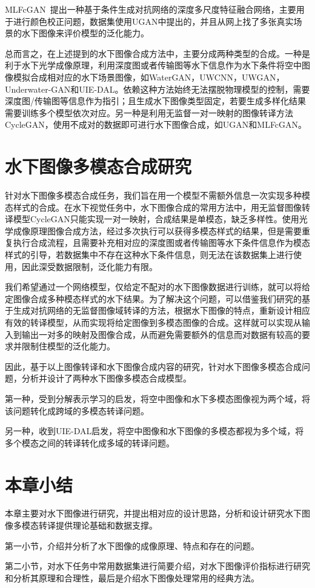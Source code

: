 MLFcGAN~\cite{liu2019mlfcgan}提出一种基于条件生成对抗网络的深度多尺度特征融合网络，主要用于进行颜色校正问题，数据集使用UGAN中提出的，并且从网上找了多张真实场景的水下图像来评价模型的泛化能力。

总而言之，在上述提到的水下图像合成方法中，主要分成两种类型的合成。一种是利于水下光学成像原理，利用深度图或者传输图等水下信息作为水下条件将空中图像模拟合成相对应的水下场景图像，如WaterGAN，UWCNN，UWGAN，Underwater-GAN和UIE-DAL。依赖这种方法始终无法摆脱物理模型的控制，需要深度图/传输图等信息作为指引；且生成水下图像类型固定，若要生成多样化结果需要训练多个模型依次对应。另一种是利用无监督一对一映射的图像转译方法CycleGAN，使用不成对的数据即可进行水下图像合成，如UGAN和MLFcGAN。

\section{水下图像多模态合成研究}
针对水下图像多模态合成任务，我们旨在用一个模型不需额外信息一次实现多种模态样式的合成。在水下视觉任务中，水下图像合成的常用方法中，用无监督图像转译模型CycleGAN只能实现一对一映射，合成结果是单模态，缺乏多样性。使用光学成像原理图像合成方法，经过多次执行可以获得多模态样式的结果，但是需要重复执行合成流程，且需要补充相对应的深度图或者传输图等水下条件信息作为模态样式的引导，若数据集中不存在这种水下条件信息，则无法在该数据集上进行使用，因此深受数据限制，泛化能力有限。

我们希望通过一个网络模型，仅给定不配对的水下图像数据进行训练，就可以将给定图像合成多种模态样式的水下结果。为了解决这个问题，可以借鉴我们研究的基于生成对抗网络的无监督图像域转译的方法，根据水下图像的特点，重新设计相应有效的转译模型，从而实现将给定图像到多模态图像的合成。这样就可以实现从输入到输出一对多的映射及图像合成，从而避免需要额外的信息而对数据有较高的要求并限制住模型的泛化能力。

因此，基于以上图像转译和水下图像合成内容的研究，针对水下图像多模态合成问题，分析并设计了两种水下图像多模态合成模型。

第一种，受到分解表示学习的启发，将空中图像和水下多模态图像视为两个域，将该问题转化成跨域的多模态转译问题。

另一种，收到UIE-DAL启发，将空中图像和水下图像的多模态都视为多个域，将多个模态之间的转译转化成多域的转译问题。


\section{本章小结}
本章主要对水下图像进行研究，并提出相对应的设计思路，分析和设计研究水下图像多模态转译提供理论基础和数据支撑。

第一小节，介绍并分析了水下图像的成像原理、特点和存在的问题。

第二小节，对水下任务中常用数据集进行简要介绍，对水下图像评价指标进行研究和分析其原理和合理性，最后是介绍水下图像处理常用的经典方法。


